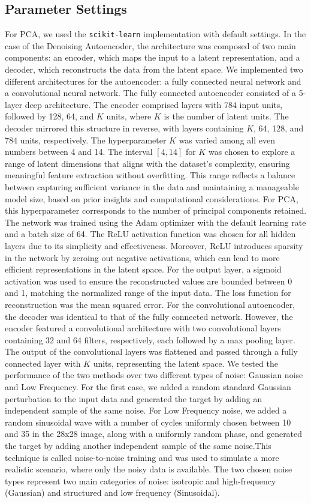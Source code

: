 \documentclass[10pt,conference,compsocconf]{IEEEtran}
\begin{document}
\subsection*{Parameter Settings}
For PCA, we used the \texttt{scikit-learn} implementation with default settings. In the case of the Denoising Autoencoder, the architecture was composed of two main components: an encoder, which maps the input to a latent representation, and a decoder, which reconstructs the data from the latent space. We implemented two different architectures for the autoencoder: a fully connected neural network and a convolutional neural network.
The fully connected autoencoder consisted of a 5-layer deep architecture. The encoder comprised layers with 784 input units, followed by 128, 64, and \(K\) units, where \(K\) is the number of latent units. The decoder mirrored this structure in reverse, with layers containing \(K\), 64, 128, and 784 units, respectively. The hyperparameter \(K\) was varied among all even numbers between 4 and 14. The interval \([4, 14]\) for \(K\) was chosen to explore a range of latent dimensions that aligns with the dataset's complexity, ensuring meaningful feature extraction without overfitting. This range reflects a balance between capturing sufficient variance in the data and maintaining a manageable model size, based on prior insights and computational considerations. For PCA, this hyperparameter corresponds to the number of principal components retained. The network was trained using the Adam optimizer with the default learning rate and a batch size of 64. The ReLU activation function was chosen for all hidden layers due to its simplicity and effectiveness. Moreover, ReLU introduces sparsity in the network by zeroing out negative activations, which can lead to more efficient representations in the latent space. For the output layer, a sigmoid activation was used to ensure the reconstructed values are bounded between 0 and 1, matching the normalized range of the input data. The loss function for reconstruction was the mean squared error.
For the convolutional autoencoder, the decoder was identical to that of the fully connected network. However, the encoder featured a convolutional architecture with two convolutional layers containing 32 and 64 filters, respectively, each followed by a max pooling layer. The output of the convolutional layers was flattened and passed through a fully connected layer with \(K\) units, representing the latent space.
We tested the performance of the two methods over two different types of noise: Gaussian noise and Low Frequency.
For the first case, we added a random standard Gaussian perturbation to the input data and generated the target by adding an independent sample of the same noise. For Low Frequency noise, we added a random sinusoidal wave with a number of cycles uniformly chosen between 10 and 35 in the 28x28 image, along with a uniformly random phase, and generated the target by adding another independent sample of the same noise.This technique is called noise-to-noise training and 
was used to simulate a more realistic scenario, where only the noisy data is available. The two chosen noise types
represent two main categories of noise: isotropic and high-frequency (Gaussian) and structured and low frequency (Sinusoidal).
\end{document}
